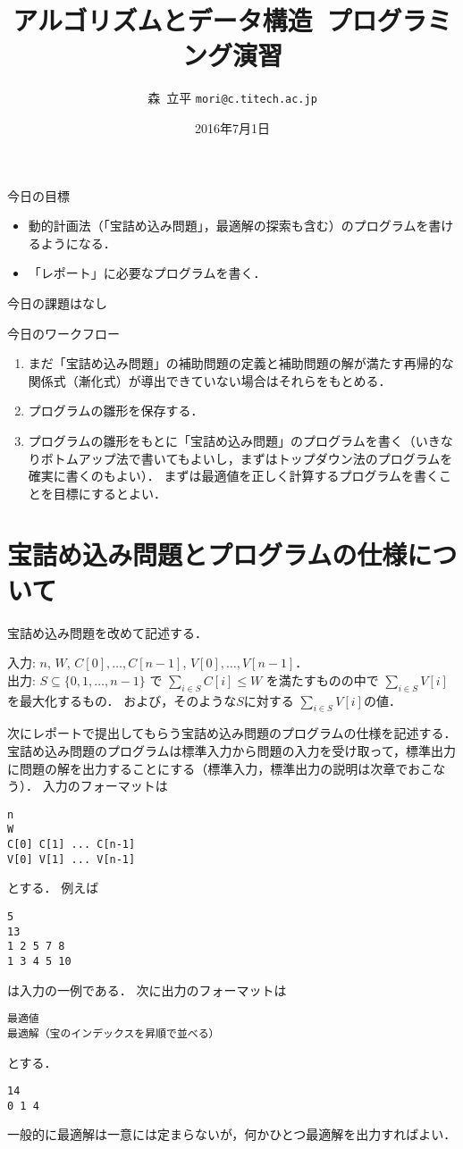 \documentclass[a4paper,twoside,onecolumn,openany,article]{memoir}
\title{アルゴリズムとデータ構造~プログラミング演習}
\date{2016年7月1日}
\author{森~立平 \texttt{mori@c.titech.ac.jp}}
\theoremstyle{remark}
\begin{document}
\maketitle

\noindent
今日の目標
\begin{itemize}
\item 動的計画法（「宝詰め込み問題」，最適解の探索も含む）のプログラムを書けるようになる．
\item 「レポート」に必要なプログラムを書く．
\end{itemize}

\noindent
今日の課題はなし

\vspace{.5em}
\noindent
今日のワークフロー
\begin{enumerate}
\item まだ「宝詰め込み問題」の補助問題の定義と補助問題の解が満たす再帰的な関係式（漸化式）が導出できていない場合はそれらをもとめる．
\item プログラムの雛形を保存する．
\item プログラムの雛形をもとに「宝詰め込み問題」のプログラムを書く（いきなりボトムアップ法で書いてもよいし，まずはトップダウン法のプログラムを確実に書くのもよい）．
まずは最適値を正しく計算するプログラムを書くことを目標にするとよい．
\end{enumerate}

\section{宝詰め込み問題とプログラムの仕様について}
宝詰め込み問題を改めて記述する．

\vspace{.5em}
\noindent
入力: $n$, $W$, $C[0],\dotsc, C[n-1]$, $V[0],\dotsc,V[n-1]$．\\
出力: $S\subseteq\{0,1,\dotsc,n-1\}$ で $\sum_{i\in S} C[i] \le W$ を満たすものの中で $\sum_{i\in S}V[i]$ を最大化するもの．
および，そのような$S$に対する $\sum_{i\in S} V[i]$の値．

\vspace{.5em}

次にレポートで提出してもらう宝詰め込み問題のプログラムの仕様を記述する．
宝詰め込み問題のプログラムは標準入力から問題の入力を受け取って，標準出力に問題の解を出力することにする（標準入力，標準出力の説明は次章でおこなう）．
入力のフォーマットは
\begin{verbatim}
n
W
C[0] C[1] ... C[n-1]
V[0] V[1] ... V[n-1]
\end{verbatim}
とする．
例えば
\begin{verbatim}
5
13
1 2 5 7 8
1 3 4 5 10
\end{verbatim}
は入力の一例である．
次に出力のフォーマットは
\begin{verbatim}
最適値
最適解（宝のインデックスを昇順で並べる）
\end{verbatim}
とする．
\begin{verbatim}
14
0 1 4
\end{verbatim}
一般的に最適解は一意には定まらないが，何かひとつ最適解を出力すればよい．
\end{document}
